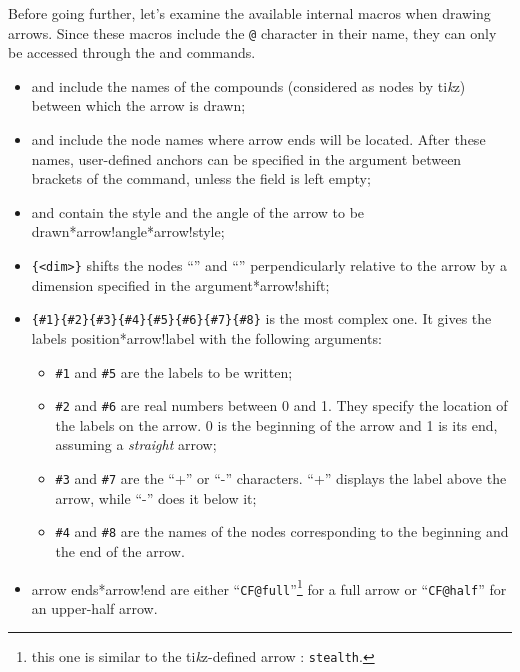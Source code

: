 \documentclass[10pt]{article}
\makeatletter
\newcommand\idx{\@ifstar{\let\print@or@not\@gobble\idx@}{\let\print@or@not\@firstofone\idx@}}
\newcommand\idx@[1]{%
	\ifcat\expandafter\noexpand\@car#1\@nil\relax%
		\expandafter\ifx\@car#1\@nil\protect
			\index{#1}%
			\print@or@not{#1}%
		\else
			\saveexpandmode\expandarg
			\StrSubstitute{\string#1}{\string @}{\@empty\protect\symbol{'100}}[\temp@]%
			\StrGobbleLeft\temp@1[\temp@]%
			\restoreexpandmode
			\expandafter\index\expandafter{\temp@ @\protect\texttt{\protect\textbackslash\temp@}}%
			\print@or@not{\texttt{\string#1}}%
		\fi
	\else
		\index{#1}%
		\print@or@not{#1}%
	\fi
}
\newcommand\TIKZ{ti\textit kz\xspace}
\makeatother
\begin{document}
Before going further, let's examine the available internal macros  when drawing arrows. Since these macros include the  \verb-@-  character in their name, they can only be accessed through the \idx{\makeatletter} and \idx{\makeatother} commands.
\begin{itemize}
	\item \idx{\CF@arrow@start@name} and \idx{\CF@arrow@end@name} include the names of the compounds (considered as nodes by \TIKZ) between which the arrow is drawn;
	\item \idx{\CF@arrow@start@node} and \idx{\CF@arrow@end@node} include the node names where arrow ends will be located. After these names, user-defined anchors can be specified in the argument between brackets of the \idx\arrow command, unless the field is left empty;
	\item \idx{\CF@arrow@current@style} and \idx{\CF@arrow@current@angle} contain the style and the angle of the arrow to be drawn\idx*{arrow!angle}\idx*{arrow!style};
	\item \idx{\CF@arrow@shift@nodes}\verb-{<dim>}- shifts the nodes ``\idx{\CF@arrow@start@node}'' and ``\idx{\CF@arrow@end@node}'' perpendicularly relative to the arrow by a dimension specified in the argument\idx*{arrow!shift};
	\item \idx{\CF@arrow@display@label}\verb/{#1}{#2}{#3}{#4}{#5}{#6}{#7}{#8}/ is the most complex one. It gives the labels position\idx*{arrow!label} with the following arguments:
	\begin{itemize}
		\item \verb-#1- and \verb-#5- are the labels to be written;
		\item \verb-#2- and \verb-#6- are real numbers between 0 and 1. They specify the location  of the labels on the arrow. 0 is the beginning of the arrow and 1 is its end, assuming a \emph{straight} arrow; 
		\item \verb-#3- and \verb-#7- are the ``+'' or ``-'' characters. ``+'' displays the  label above the arrow, while  ``-'' does it below it;
		\item \verb-#4- and \verb-#8- are the names of the nodes corresponding to the beginning and the end of the arrow.
	\end{itemize}
	\item arrow ends\idx*{arrow!end} are either ``\verb-CF@full-''\footnote{this one is similar to the \TIKZ-defined arrow : \texttt{stealth}.} for a full arrow or ``\verb-CF@half-'' for an upper-half arrow.
\end{itemize}
\end{document}

